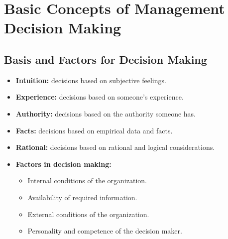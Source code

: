 \documentclass[12pt,titlepage]{article}
\begin{document}
\newpage
\section{Basic Concepts of Management Decision Making}
\subsection{Basis and Factors for Decision Making}
\begin{itemize}
    \item \textbf{Intuition:} decisions based on subjective feelings.
    \item \textbf{Experience:} decisions based on someone's experience.
    \item \textbf{Authority:} decisions based on the authority someone has.
    \item \textbf{Facts:} decisions based on empirical data and facts.
    \item \textbf{Rational:} decisions based on rational and logical considerations.
    \item \textbf{Factors in decision making:}
    \begin{itemize}
        \item Internal conditions of the organization.
        \item Availability of required information.
        \item External conditions of the organization.
        \item Personality and competence of the decision maker.
    \end{itemize}
\end{itemize}
\end{document}
